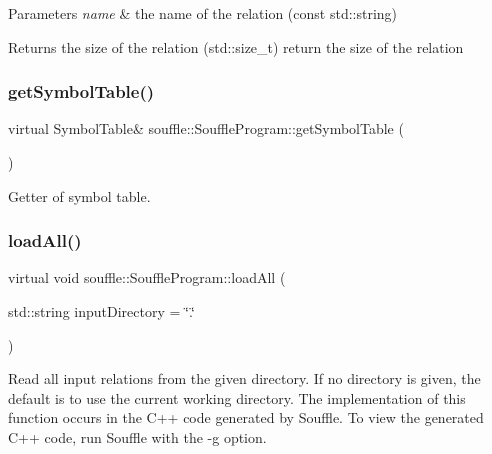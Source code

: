 \begin{DoxyParams}{Parameters}
{\em name} & the name of the relation (const std\+::string) \\
\hline
\end{DoxyParams}
\begin{DoxyReturn}{Returns}
the size of the relation (std\+::size\+\_\+t) return the size of the relation 
\end{DoxyReturn}
\mbox{\label{classsouffle_1_1_souffle_program_a90cd5579baa81512a0137fac420a43e0}} 
\subsubsection{\texorpdfstring{get\+Symbol\+Table()}{getSymbolTable()}}
{\footnotesize\ttfamily virtual Symbol\+Table\& souffle\+::\+Souffle\+Program\+::get\+Symbol\+Table (\begin{DoxyParamCaption}{ }\end{DoxyParamCaption})\hspace{0.3cm}{\ttfamily [pure virtual]}}

Getter of symbol table. \mbox{\label{classsouffle_1_1_souffle_program_a82608bf8018e98e96d06d285333c8620}} 
\subsubsection{\texorpdfstring{load\+All()}{loadAll()}}
{\footnotesize\ttfamily virtual void souffle\+::\+Souffle\+Program\+::load\+All (\begin{DoxyParamCaption}\item[{std\+::string}]{input\+Directory = {\ttfamily \char`\"{}.\char`\"{}} }\end{DoxyParamCaption})\hspace{0.3cm}{\ttfamily [pure virtual]}}

Read all input relations from the given directory. If no directory is given, the default is to use the current working directory. The implementation of this function occurs in the C++ code generated by Souffle. To view the generated C++ code, run Souffle with the {\ttfamily -\/g} option. \mbox{\label{classsouffle_1_1_souffle_program_aae47a2083a0d67eb44c9914cb22ab182}} 
